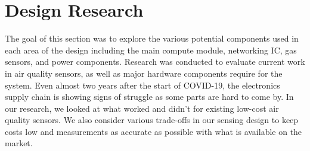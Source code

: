 
\section{Design Research}
The goal of this section was to explore the various potential components used in
each area of the design including the main compute module, networking IC, gas
sensors, and power components. Research was conducted to evaluate current work 
in air quality sensors, as well as major hardware components require for the 
system. Even almost two years after the start of COVID-19, the electronics supply
chain is showing signs of struggle
as some parts are hard to come by. In our research, we looked at what worked and
didn't for existing low-cost air quality sensors. We also consider various
trade-offs in our sensing design to keep costs low and measurements as accurate
as possible with what is available on the market. 

